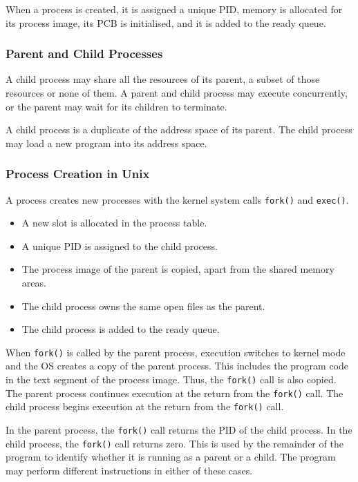 When a process is created, it is assigned a unique PID, memory is allocated for its process image, its PCB is initialised, and it is added to the ready queue.

\subsubsection{Parent and Child Processes}

A child process may share all the resources of its parent, a subset of those resources or none of them.
A parent and child process may execute concurrently, or the parent may wait for its children to terminate.

A child process is a duplicate of the address space of its parent.
The child process may load a new program into its address space.

\subsubsection{Process Creation in Unix}

A process creates new processes with the kernel system calls \texttt{fork()} and \texttt{exec()}.
\begin{itemize}
  \item A new slot is allocated in the process table.
  \item A unique PID is assigned to the child process.
  \item The process image of the parent is copied, apart from the shared memory areas.
  \item The child process owns the same open files as the parent.
  \item The child process is added to the ready queue.
\end{itemize}

When \texttt{fork()} is called by the parent process, execution switches to kernel mode and the OS creates a copy of the parent process.
This includes the program code in the text segment of the process image.
Thus, the \texttt{fork()} call is also copied.
The parent process continues execution at the return from the \texttt{fork()} call.
The child process begins execution at the return from the \texttt{fork()} call.

In the parent process, the \texttt{fork()} call returns the PID of the child process.
In the child process, the  \texttt{fork()} call returns zero.
This is used by the remainder of the program to identify whether it is running as a parent or a child.
The program may perform different instructions in either of these cases.

